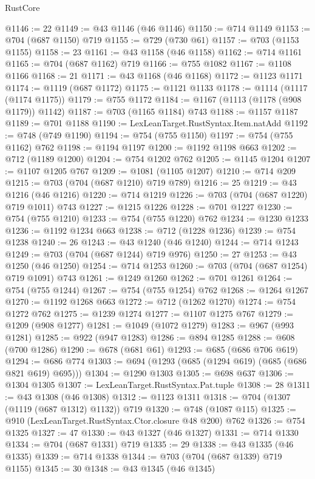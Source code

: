 \begin{lexlean}{RustCore}
\begin{coremodule}
@1146 := 22
@1149 := @43 @1146 (@46 @1146)
@1150 := @714 @1149
@1153 := @704 (@687 @1150) @719
@1155 := @729 (@730 @61)
@1157 := @703 (@1153 @1155)
@1158 := 23
@1161 := @43 @1158 (@46 @1158)
@1162 := @714 @1161
@1165 := @704 (@687 @1162) @719
@1166 := @755 @1082
@1167 := @1108 @1166
@1168 := 21
@1171 := @43 @1168 (@46 @1168)
@1172 := @1123 @1171
@1174 := @1119 (@687 @1172)
@1175 := @1121 @1133
@1178 := @1114 (@1117 (@1174 @1175))
@1179 := @755 @1172
@1184 := @1167 (@1113 (@1178 (@908 @1179)) @1142)
@1187 := @703 (@1165 @1184) @743
@1188 := @1157 @1187
@1189 := @701 @1188
@1190 := LexLeanTarget.RustSyntax.Item.natAdd
@1192 := @748 (@749 @1190)
@1194 := @754 (@755 @1150)
@1197 := @754 (@755 @1162) @762
@1198 := @1194 @1197
@1200 := @1192 @1198 @663
@1202 := @712 (@1189 @1200)
@1204 := @754 @1202 @762
@1205 := @1145 @1204
@1207 := @1107 @1205 @767
@1209 := @1081 (@1105 @1207)
@1210 := @714 @209
@1215 := @703 (@704 (@687 @1210) @719 @789)
@1216 := 25
@1219 := @43 @1216 (@46 @1216)
@1220 := @714 @1219
@1226 := @703 (@704 (@687 @1220) @719 @1011) @743
@1227 := @1215 @1226
@1228 := @701 @1227
@1230 := @754 (@755 @1210)
@1233 := @754 (@755 @1220) @762
@1234 := @1230 @1233
@1236 := @1192 @1234 @663
@1238 := @712 (@1228 @1236)
@1239 := @754 @1238
@1240 := 26
@1243 := @43 @1240 (@46 @1240)
@1244 := @714 @1243
@1249 := @703 (@704 (@687 @1244) @719 @976)
@1250 := 27
@1253 := @43 @1250 (@46 @1250)
@1254 := @714 @1253
@1260 := @703 (@704 (@687 @1254) @719 @1091) @743
@1261 := @1249 @1260
@1262 := @701 @1261
@1264 := @754 (@755 @1244)
@1267 := @754 (@755 @1254) @762
@1268 := @1264 @1267
@1270 := @1192 @1268 @663
@1272 := @712 (@1262 @1270)
@1274 := @754 @1272 @762
@1275 := @1239 @1274
@1277 := @1107 @1275 @767
@1279 := @1209 (@908 @1277)
@1281 := @1049 (@1072 @1279)
@1283 := @967 (@993 @1281)
@1285 := @922 (@947 @1283)
@1286 := @894 @1285
@1288 := @608 (@700 @1286)
@1290 := @678 (@681 @61)
@1293 := @685 (@686 @706 @619)
@1294 := @686 @774
@1303 := @694 (@1293 (@685 (@1294 @619) (@685 (@686 @821 @619) @695)))
@1304 := @1290 @1303
@1305 := @698 @637
@1306 := @1304 @1305
@1307 := LexLeanTarget.RustSyntax.Pat.tuple
@1308 := 28
@1311 := @43 @1308 (@46 @1308)
@1312 := @1123 @1311
@1318 := @704 (@1307 (@1119 (@687 @1312) @1132)) @719
@1320 := @748 (@1087 @115)
@1325 := @910 (LexLeanTarget.RustSyntax.Ctor.closure @48 @200) @762
@1326 := @754 @1325
@1327 := 47
@1330 := @43 @1327 (@46 @1327)
@1331 := @714 @1330
@1334 := @704 (@687 @1331) @719
@1335 := 29
@1338 := @43 @1335 (@46 @1335)
@1339 := @714 @1338
@1344 := @703 (@704 (@687 @1339) @719 @1155)
@1345 := 30
@1348 := @43 @1345 (@46 @1345)

\end{coremodule}
\end{lexlean}
